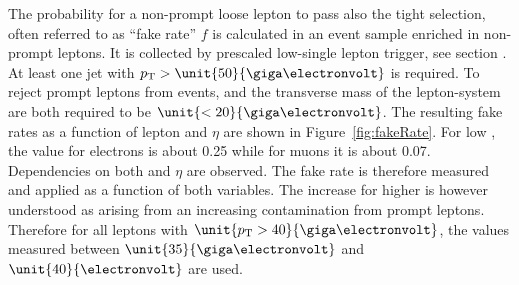 The probability for a non-prompt loose lepton to pass also the tight selection, often referred to as ``fake rate'' $f$ is calculated in an event sample enriched in non-prompt leptons. It is collected by prescaled low-\pt single lepton trigger, see section . At least one jet with $\pt > \unit{50}{\giga\electronvolt}$ is required. To reject prompt leptons from \Wjets events, \MET and the transverse mass of the lepton-\MET system are both required to be $\unit{<20}{\giga\electronvolt}$. The resulting fake rates as a function of lepton \pt and $\eta$ are shown in Figure~\ref{fig:fakeRate}. For low \pt, the value for electrons is about 0.25 while for muons it is about 0.07. Dependencies on both \pt and $\eta$ are observed. The fake rate is therefore measured and applied as a function of both variables. The increase for higher \pt is however understood as arising from an increasing contamination from prompt leptons. Therefore for all leptons with $\unit{\pt > 40}{\giga\electronvolt}$, the values measured between $\unit{35}{\giga\electronvolt}$ and $\unit{40}{\electronvolt}$ are used.  
